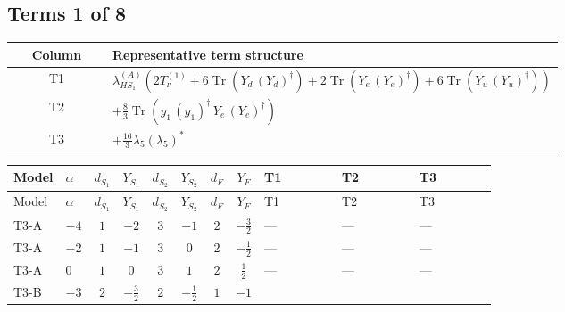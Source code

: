 \documentclass[8pt]{article}
\begin{document}
\begin{landscape}
\subsection*{Terms 1 of 8}
\begin{center}
\begin{tabular}{@{}c >{\raggedright\arraybackslash}p{0.82\linewidth}@{}}
\toprule
Column & Representative term structure \\
\midrule
T1 & \(\displaystyle {\lambda_{HS_1}^{(A)}} (2 T_{\nu}^{(1)}+6 \operatorname{Tr}\!\left({Y_d}\,\left({Y_d}\right)^{\dagger}\right)+2 \operatorname{Tr}\!\left({Y_e}\,\left({Y_e}\right)^{\dagger}\right)+6 \operatorname{Tr}\!\left({Y_u}\,\left({Y_u}\right)^{\dagger}\right))\) \\
\midrule
T2 & \(\displaystyle +\frac{8}{3} \operatorname{Tr}\!\left({y_1}\,\left({y_1}\right)^{\dagger}\,{Y_e}\,\left({Y_e}\right)^{\dagger}\right)\) \\
\midrule
T3 & \(\displaystyle +\frac{16}{3} {\lambda_5} \left({\lambda_5}\right)^{*}\) \\
\midrule
\bottomrule
\end{tabular}
\end{center}
\smallskip
\tiny
\begin{longtable}{@{}llcccccc >{\raggedright\arraybackslash}p{0.21\linewidth} >{\raggedright\arraybackslash}p{0.21\linewidth} >{\raggedright\arraybackslash}p{0.21\linewidth}@{}}
\toprule
Model & $\alpha$ & $d_{S_1}$ & $Y_{S_1}$ & $d_{S_2}$ & $Y_{S_2}$ & $d_F$ & $Y_F$ & T1 & T2 & T3 \\
\midrule
\endfirsthead
\toprule
Model & $\alpha$ & $d_{S_1}$ & $Y_{S_1}$ & $d_{S_2}$ & $Y_{S_2}$ & $d_F$ & $Y_F$ & T1 & T2 & T3 \\
\midrule
\endhead
T3-A & $-4$ & $1$ & $-2$ & $3$ & $-1$ & $2$ & $-\frac{3}{2}$ & --- & --- & --- \\
\midrule
T3-A & $-2$ & $1$ & $-1$ & $3$ & $0$ & $2$ & $-\frac{1}{2}$ & --- & --- & --- \\
\midrule
T3-A & $0$ & $1$ & $0$ & $3$ & $1$ & $2$ & $\frac{1}{2}$ & --- & --- & --- \\
\midrule
T3-B & $-3$ & $2$ & $-\frac{3}{2}$ & $2$ & $-\frac{1}{2}$ & $1$ & $-1$ & \scriptsize\adjustbox{max width=\linewidth}{$\begin{gathered} {\lambda_{HS_1}^{(A)}} (2 T_{\nu}^{(1)}+6 \operatorname{Tr}\!\left({Y_d}\,\left({Y_d}\right)^{\dagger}\right)+2 \operatorname{Tr}\!\left({Y_e}\,\left({Y_e}\right)^{\dagger}\right)+6 \operatorname{Tr}\!\left({Y_u}\,\left({Y_u}\right)^{\dagger}\right))\end{gathered}$} & \scriptsize\adjustbox{max width=\linewidth}{$\begin{gathered} +\frac{8}{3} \operatorname{Tr}\!\left({y_1}\,\left({y_1}\right)^{\dagger}\,{Y_e}\,\left({Y_e}\right)^{\dagger}\right)\end{gathered}$} & \scriptsize\adjustbox{max width=\linewidth}{$\begin{gathered} +\frac{16}{3} {\lambda_5} \left({\lambda_5}\right)^{*}\end{gathered}$} \\

\end{longtable}
\end{landscape}
\end{document}
